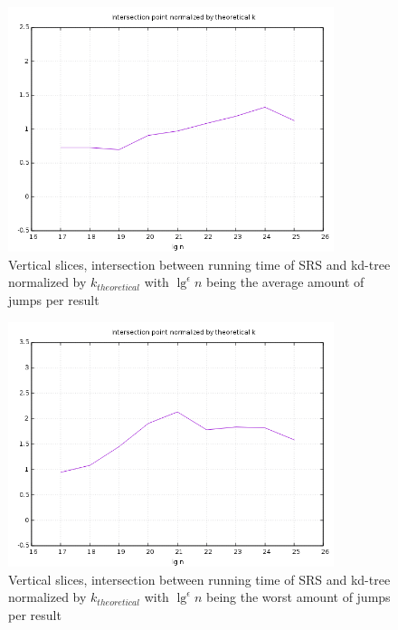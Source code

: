 \begin{figure}[h]
    \centering
    \includegraphics[width = 0.85\textwidth]{pictures/analysis/vert_theory.png}
    \caption{Vertical slices, intersection between running time of SRS and kd-tree normalized by $k_{theoretical}$ with $\lg^\epsilon n$ being the average amount of jumps per result}\label{fig:vert_theory}
\end{figure}


\begin{figure}[h]
    \centering
    \includegraphics[width = 0.85\textwidth]{pictures/analysis/vert_theory_worst_jump.png}
    \caption{Vertical slices, intersection between running time of SRS and kd-tree normalized by $k_{theoretical}$ with $\lg^\epsilon n$ being the worst amount of jumps per result}\label{fig:vert_theory_worst_jump}
\end{figure}
\clearpage


